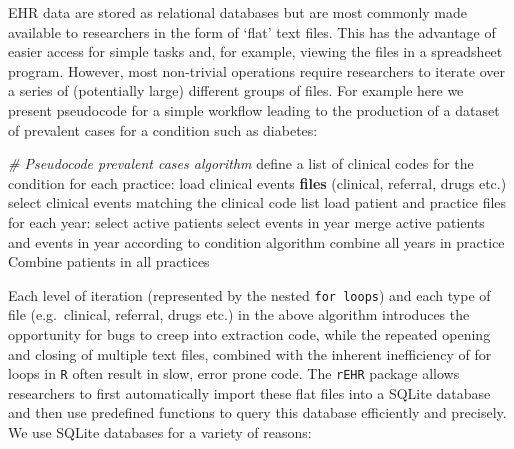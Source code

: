\documentclass[]{article}
\newenvironment{Shaded}{\begin{snugshade}}{\end{snugshade}}
\newcommand{\KeywordTok}[1]{\textcolor[rgb]{0.13,0.29,0.53}{\textbf{{#1}}}}
\newcommand{\StringTok}[1]{\textcolor[rgb]{0.31,0.60,0.02}{{#1}}}
\newcommand{\CommentTok}[1]{\textcolor[rgb]{0.56,0.35,0.01}{\textit{{#1}}}}
\newcommand{\NormalTok}[1]{{#1}}
\begin{document}
EHR data are stored as relational databases but are most commonly made
available to researchers in the form of `flat' text files. This has the
advantage of easier access for simple tasks and, for example, viewing
the files in a spreadsheet program. However, most non-trivial operations
require researchers to iterate over a series of (potentially large)
different groups of files. For example here we present pseudocode for a
simple workflow leading to the production of a dataset of prevalent
cases for a condition such as diabetes:

\begin{Shaded}
\begin{Highlighting}[]
\CommentTok{# Pseudocode prevalent cases algorithm}
\NormalTok{define a list of clinical codes for the condition}
\NormalTok{for each practice:}
\StringTok{    }\NormalTok{load clinical events }\KeywordTok{files} \NormalTok{(clinical, referral, drugs etc.)}
    \NormalTok{select clinical events matching the clinical code list}
    \NormalTok{load patient and practice files}
    \NormalTok{for each year:}
\StringTok{        }\NormalTok{select active patients}
        \NormalTok{select events in year}
        \NormalTok{merge active patients and events in year according to condition algorithm}
    \NormalTok{combine all years in practice}
\NormalTok{Combine patients in all practices}
\end{Highlighting}
\end{Shaded}

Each level of iteration (represented by the nested \texttt{for loops})
and each type of file (e.g.~clinical, referral, drugs etc.) in the above
algorithm introduces the opportunity for bugs to creep into extraction
code, while the repeated opening and closing of multiple text files,
combined with the inherent inefficiency of for loops in \texttt{R} often
result in slow, error prone code. The \texttt{rEHR} package allows
researchers to first automatically import these flat files into a SQLite
database and then use predefined functions to query this database
efficiently and precisely. We use SQLite databases for a variety of
reasons:
\end{document}
